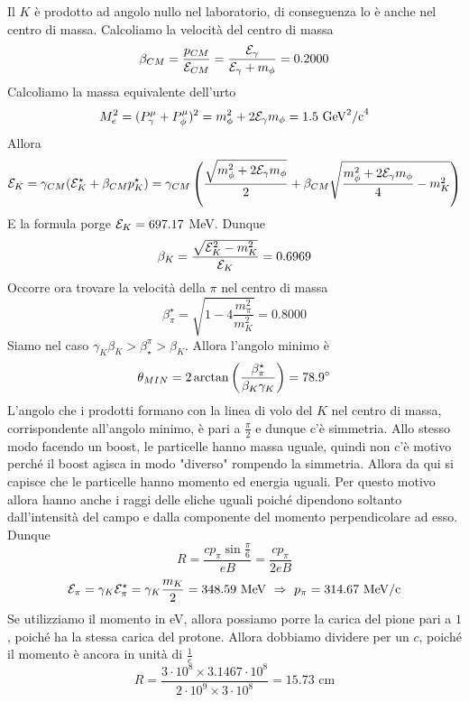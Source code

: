 \documentclass[12pt,twoside,a4]{article}
\begin{document}
\begin{solution}
Il $K$ è prodotto ad angolo nullo nel laboratorio, di conseguenza lo è anche nel centro di massa. Calcoliamo la velocità  del centro di massa 
$$ \beta_{CM} = \frac{p_{CM}}{\mathcal{E}_{CM}} = \frac{\mathcal{E}_\gamma}{ \mathcal{E}_\gamma + m_\phi} = 0.2000$$
Calcoliamo la massa equivalente dell'urto
$$ M_e^2 = (P^\mu_\gamma + P^\mu_\phi)^2 = m^2_\phi + 2\mathcal{E}_\gamma m_\phi = 1.5 \mbox{ GeV}^2 \mbox{/c}^4$$
Allora 
$$ \mathcal{E}_K = \gamma_{CM} (\mathcal{E}_K^\star + \beta_{CM} p_K^\star) = \gamma_{CM} \left({\frac{\sqrt{m^2_\phi + 2\mathcal{E}_\gamma m_\phi}}{2} + \beta_{CM} \sqrt{ \frac{m^2_\phi + 2\mathcal{E}_\gamma m_\phi}{4} -m_K^2}}\right)$$
E la formula porge $\mathcal{E}_K = 697.17 $ MeV. Dunque
$$ \beta_K = \frac{\sqrt{\mathcal{E}_K^2 - m_K^2}}{\mathcal{E}_K} = 0.6969$$
Occorre ora trovare la velocità  della $\pi$ nel centro di massa 
$$ \beta_\pi^\star = \sqrt{1 - 4\frac{m^2_\pi}{m^2_K}} = 0.8000$$
Siamo nel caso $\gamma_{K} \beta_{K} > \beta_\star^\pi > \beta_K$. Allora l'angolo minimo è
$$ \theta_{MIN} = 2 \arctan \left({\frac{\beta^\star_\pi}{\beta_{K} \gamma_{K}}}\right) = 78.9^\circ$$
L'angolo che i prodotti formano con la linea di volo del $K$ nel centro di massa, corrispondente all'angolo minimo, è pari a $\frac{\pi}{2}$ e dunque c'è simmetria. Allo stesso modo facendo un boost, le particelle hanno massa uguale, quindi non c'è motivo perché il boost agisca in modo "diverso" rompendo la simmetria. Allora da qui si capisce che le particelle hanno momento ed energia uguali. Per questo motivo allora hanno anche i raggi delle eliche uguali poiché dipendono soltanto dall'intensità  del campo e dalla componente del momento perpendicolare ad esso. Dunque
$$ R = \frac{c p_\pi \sin \frac{\pi}{6}}{ e B} = \frac{c p_\pi}{2 e B} $$ 
$$ \mathcal{E}_\pi = \gamma_K \mathcal{E}_\pi^\star = \gamma_K \frac{m_K}{2} = 348.59 \mbox{ MeV}  \  \Rightarrow  \  p_\pi = 314.67 \mbox{ MeV/c}$$
Se utilizziamo il momento in eV, allora possiamo porre la carica del pione pari a $1$, poiché ha la stessa carica del protone. Allora dobbiamo dividere per un $c$, poiché il momento è ancora in unità  di $\frac{1}{c}$
$$ R = \frac{3 \cdot 10^8 \times 3.1467 \cdot 10^8 }{2 \cdot 10^9 \times 3 \cdot 10^8} =15.73 \mbox{ cm}$$
\end{solution}
\end{document}
